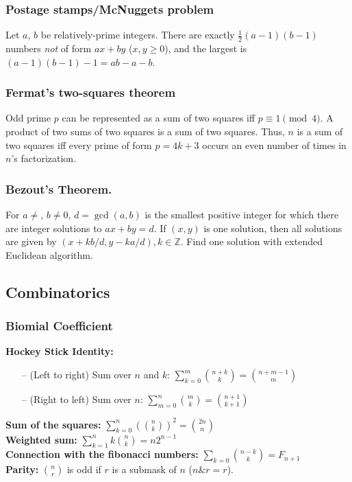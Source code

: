 \begin{small}
\subsubsection{Postage stamps/McNuggets problem}  Let $a$, $b$ be relatively-prime integers.
There are exactly $\frac{1}{2}(a-1)(b-1)$ numbers \emph{not} of form $ax+by$ ($x,y \ge 0$),
and the largest is $(a-1)(b-1)-1 = ab - a - b$.

\subsubsection{Fermat's two-squares theorem}  Odd prime $p$ can be represented
as a sum of two squares iff $p \equiv 1 {\pmod 4}$.
A product of two sums of two squares is a sum of two squares.
Thus, $n$ is a sum of two squares iff every prime of
form $p=4k+3$ occurs an even number of times in $n$'s factorization.

\subsubsection{Bezout's Theorem.} For $a \neq $, $b \neq 0$,  $d=\gcd(a,b)$ is the smallest positive integer for which there are integer solutions to $ax+by=d$. If $(x,y)$ is one solution, then all solutions are given by $\left(x+kb/d, y-ka/d\right), k\in\mathbb{Z}$. Find one solution with extended Euclidean algorithm.


\subsection{Combinatorics}
  \subsubsection{Biomial Coefficient}
  \textbf{Hockey Stick Identity:}\\
  \begin{itemize}[noitemsep]
    \itemsep0em 
    \item[--] (Left to right) Sum over \( n \) and \( k \): \( \sum_{k = 0}^m \binom{n + k}{k} = \binom{n + m - 1}{m} \)
    \item[--] (Right to left) Sum over \( n \): \( \sum_{m = 0}^n \binom{m}{k} = \binom{n + 1}{k + 1} \)
  \end{itemize}
  \textbf{Sum of the squares:} \( \sum_{k = 0}^n (\binom{n}{k})^2 = \binom{2n}{n} \) \\
  \textbf{Weighted sum:} \( \sum_{k = 1}^n k \binom{n}{k} = n2^{n - 1} \) \\
  \textbf{Connection with the fibonacci numbers:} \( \sum_{k = 0}\binom{n - k}{k} = F_{n + 1} \)\\
  \textbf{Parity:} $\binom{n}{r}$ is odd if $r$ is a submask of $n$ ($n \& r = r$).


\end{small}
